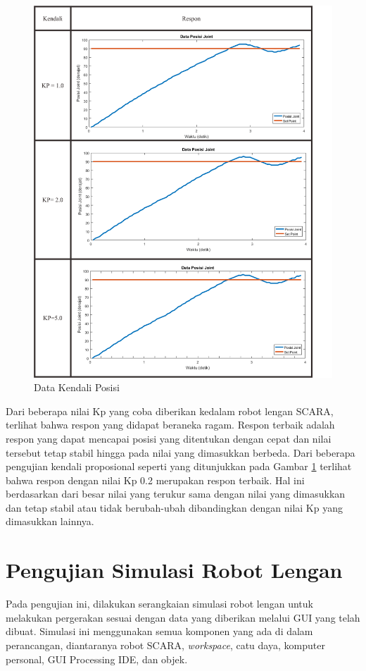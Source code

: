  \begin{figure}[H]
	\centering
	\includegraphics[width=13cm]{gambar/kendali3.png}
	\caption{Data Kendali Posisi}
	\label{pic.kendali}
\end{figure}

Dari beberapa nilai Kp yang coba diberikan kedalam robot lengan SCARA, terlihat bahwa respon yang didapat beraneka ragam. Respon terbaik adalah respon yang dapat mencapai posisi yang ditentukan dengan cepat dan nilai tersebut tetap stabil hingga pada nilai yang dimasukkan berbeda. Dari beberapa pengujian kendali proposional seperti yang ditunjukkan pada Gambar \ref{pic.kendali} terlihat bahwa respon dengan nilai Kp 0.2 merupakan respon terbaik. Hal ini berdasarkan dari besar nilai yang terukur sama dengan nilai yang dimasukkan dan tetap stabil atau tidak berubah-ubah dibandingkan dengan nilai Kp yang dimasukkan lainnya.
\section{Pengujian Simulasi Robot Lengan}
Pada pengujian ini, dilakukan serangkaian simulasi robot lengan untuk melakukan pergerakan sesuai dengan data yang diberikan melalui GUI yang telah dibuat. Simulasi ini menggunakan semua komponen yang ada di dalam perancangan, diantaranya robot SCARA, \textit{workspace}, catu daya, komputer personal, GUI Processing IDE, dan objek.

